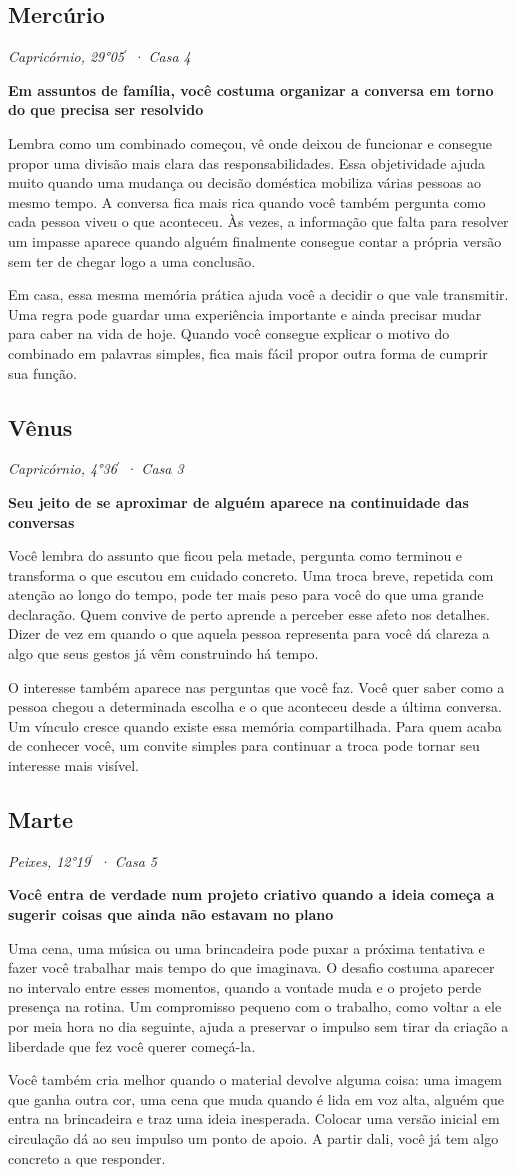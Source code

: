 \documentclass[11pt,a4paper]{article}
\newcommand{\leitura}[3]{\subsection{#1}\textit{#2}\par #3}
\newcommand{\subtituloleitura}[1]{\textbf{#1}\par\nopagebreak[4]}
\begin{document}
\leitura{Mercúrio}{Capricórnio, 29°05\ensuremath{^{\prime}} · Casa 4}{
\subtituloleitura{Em assuntos de família, você costuma organizar a conversa em torno do que precisa ser resolvido} Lembra como um combinado começou, vê onde deixou de funcionar e consegue propor uma divisão mais clara das responsabilidades. Essa objetividade ajuda muito quando uma mudança ou decisão doméstica mobiliza várias pessoas ao mesmo tempo. A conversa fica mais rica quando você também pergunta como cada pessoa viveu o que aconteceu. Às vezes, a informação que falta para resolver um impasse aparece quando alguém finalmente consegue contar a própria versão sem ter de chegar logo a uma conclusão.

Em casa, essa mesma memória prática ajuda você a decidir o que vale transmitir. Uma regra pode guardar uma experiência importante e ainda precisar mudar para caber na vida de hoje. Quando você consegue explicar o motivo do combinado em palavras simples, fica mais fácil propor outra forma de cumprir sua função.
}

\leitura{Vênus}{Capricórnio, 4°36\ensuremath{^{\prime}} · Casa 3}{
\subtituloleitura{Seu jeito de se aproximar de alguém aparece na continuidade das conversas} Você lembra do assunto que ficou pela metade, pergunta como terminou e transforma o que escutou em cuidado concreto. Uma troca breve, repetida com atenção ao longo do tempo, pode ter mais peso para você do que uma grande declaração. Quem convive de perto aprende a perceber esse afeto nos detalhes. Dizer de vez em quando o que aquela pessoa representa para você dá clareza a algo que seus gestos já vêm construindo há tempo.

O interesse também aparece nas perguntas que você faz. Você quer saber como a pessoa chegou a determinada escolha e o que aconteceu desde a última conversa. Um vínculo cresce quando existe essa memória compartilhada. Para quem acaba de conhecer você, um convite simples para continuar a troca pode tornar seu interesse mais visível.
}

\leitura{Marte}{Peixes, 12°19\ensuremath{^{\prime}} · Casa 5}{
\subtituloleitura{Você entra de verdade num projeto criativo quando a ideia começa a sugerir coisas que ainda não estavam no plano} Uma cena, uma música ou uma brincadeira pode puxar a próxima tentativa e fazer você trabalhar mais tempo do que imaginava. O desafio costuma aparecer no intervalo entre esses momentos, quando a vontade muda e o projeto perde presença na rotina. Um compromisso pequeno com o trabalho, como voltar a ele por meia hora no dia seguinte, ajuda a preservar o impulso sem tirar da criação a liberdade que fez você querer começá-la.

Você também cria melhor quando o material devolve alguma coisa: uma imagem que ganha outra cor, uma cena que muda quando é lida em voz alta, alguém que entra na brincadeira e traz uma ideia inesperada. Colocar uma versão inicial em circulação dá ao seu impulso um ponto de apoio. A partir dali, você já tem algo concreto a que responder.
}
\end{document}
